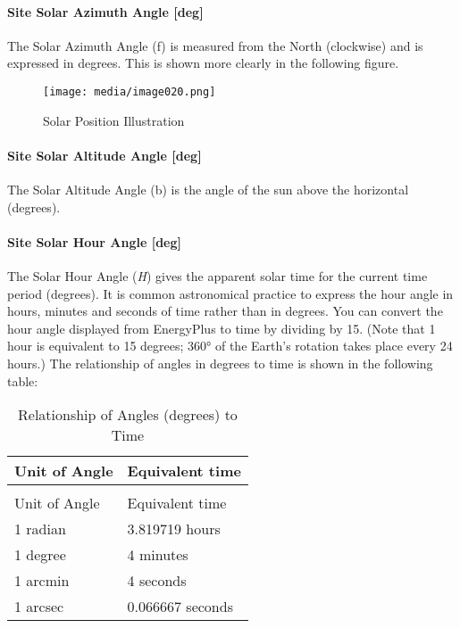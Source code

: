 \paragraph{Site Solar Azimuth Angle {[}deg{]}}\label{site-solar-azimuth-angle-deg}

The Solar Azimuth Angle (f) is measured from the North (clockwise) and is expressed in degrees. This is shown more clearly in the following figure.

\begin{figure}[hbtp] %
\centering
\texttt{[image: media/image020.png]}
\caption{Solar Position Illustration \protect \label{fig:solar-position-illustration}}
\end{figure}

\paragraph{Site Solar Altitude Angle {[}deg{]}}\label{site-solar-altitude-angle-deg}

The Solar Altitude Angle (b) is the angle of the sun above the horizontal (degrees).

\paragraph{Site Solar Hour Angle {[}deg{]}}\label{site-solar-hour-angle-deg}

The Solar Hour Angle (\emph{H}) gives the apparent solar time for the current time period (degrees). It is common astronomical practice to express the hour angle in hours, minutes and seconds of time rather than in degrees. You can convert the hour angle displayed from EnergyPlus to time by dividing by 15. (Note that 1 hour is equivalent to 15 degrees; 360° of the Earth's rotation takes place every 24 hours.) The relationship of angles in degrees to time is shown in the following table:

\begin{longtable}[c]{@{}ll@{}}
\caption{Relationship of Angles (degrees) to Time \label{table:relationship-of-angles-degrees-to-time}} \tabularnewline
\toprule
Unit of Angle & Equivalent time \tabularnewline
\midrule
\endfirsthead

\caption[]{Relationship of Angles (degrees) to Time} \tabularnewline
\toprule
Unit of Angle & Equivalent time \tabularnewline
\midrule
\endhead

1 radian & 3.819719 hours \tabularnewline
1 degree & 4 minutes \tabularnewline
1 arcmin & 4 seconds \tabularnewline
1 arcsec & 0.066667 seconds \tabularnewline
\bottomrule
\end{longtable}

